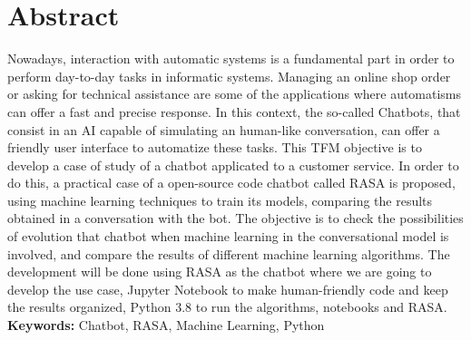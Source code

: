\cleardoublepage
{}
\chapter*{Abstract}
Nowadays, interaction with automatic systems is a fundamental part in order to perform day-to-day tasks in informatic systems. Managing an online shop order or asking for technical assistance are some of the applications where automatisms can offer a fast and precise response. In this context, the so-called Chatbots, that consist in an AI capable of simulating an human-like conversation, can offer a friendly user interface to automatize these tasks. This TFM objective is to develop a case of study of a chatbot applicated to a customer service. In order to do this, a practical case of a open-source code chatbot called RASA is proposed, using machine learning techniques to train its models, comparing the results obtained in a conversation with the bot. The objective is to check the possibilities of evolution that chatbot when machine learning in the conversational model is involved, and compare the results of different machine learning algorithms. The development will be done using RASA as the chatbot where we are going to develop the use case, Jupyter Notebook to make human-friendly code and keep the results organized, Python 3.8 to run the algorithms, notebooks and RASA. 
\vfill
\textbf{Keywords: }Chatbot, RASA, Machine Learning, Python 